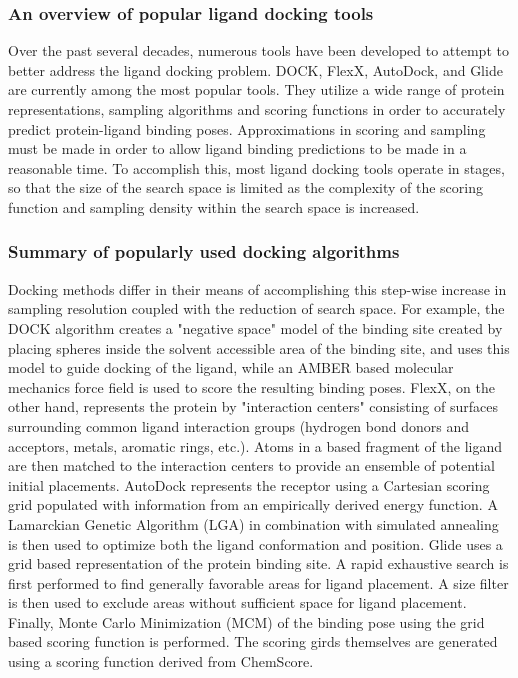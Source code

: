 \subsubsection{An overview of popular ligand docking tools}

Over the past several decades, numerous tools have been developed to attempt to better address the ligand docking problem.
DOCK\citep{Ewing:2001wu}, FlexX\citep{Hindle:2002tk}, AutoDock\citep{Morris:1998vi}, and Glide\citep{Friesner:2004hm} are currently among the most popular tools.
They utilize a wide range of protein representations, sampling algorithms and scoring functions in order to accurately predict protein-ligand binding poses.
Approximations in scoring and sampling must be made in order to allow ligand binding predictions to be made in a reasonable time.
To accomplish this, most ligand docking tools operate in stages, so that the size of the search space is limited as the complexity of the scoring function and sampling density within the search space is increased.

\subsubsection{Summary of popularly used docking algorithms}
Docking methods differ in their means of accomplishing this step-wise increase in sampling resolution coupled with the reduction of search space.
For example, the DOCK algorithm creates a "negative space" model of the binding site created by placing spheres inside the solvent accessible area of the binding site, and uses this model to guide docking of the ligand, while an AMBER based molecular mechanics force field is used to score the resulting binding poses\citep{Moustakas:2006fe}.
FlexX, on the other hand, represents the protein by "interaction centers" consisting of surfaces surrounding common ligand interaction groups (hydrogen bond donors and acceptors, metals, aromatic rings, etc.).
Atoms in a based fragment of the ligand are then matched to the interaction centers to provide an ensemble of potential initial placements\citep{Rarey:1996hf}.
AutoDock represents the receptor using a Cartesian scoring grid populated with information from an empirically derived energy function.
A Lamarckian Genetic Algorithm (LGA) in combination with simulated annealing is then used to optimize both the ligand conformation and position\citep{Morris:1998vi}.
Glide uses a grid based representation of the protein binding site. A rapid exhaustive search is first performed to find generally favorable areas for ligand placement.
A size filter is then used to exclude areas without sufficient space for ligand placement.
Finally, Monte Carlo Minimization (MCM) of the binding pose using the grid based scoring function is performed.
The scoring girds themselves are generated using a scoring function derived from ChemScore\citep{Friesner:2004hm}.


